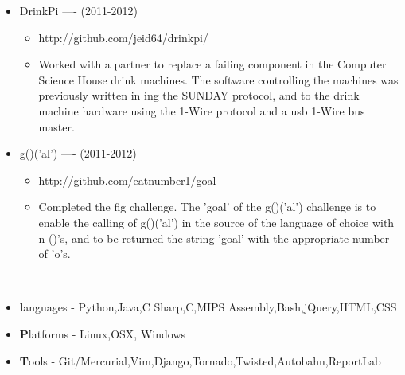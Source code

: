 \documentclass[a4paper,10pt]{article}
\newcommand{\isep}{-2 pt}
\newcommand{\lsep}{-0.5cm}
\begin{document}
\begin{itemize}
\item 
 DrinkPi ---- (2011-2012)    \\[-0.6cm]

	\begin{itemize}\itemsep \isep 
	\item http://github.com/jeid64/drinkpi/

	\item Worked with a partner to replace a failing component in the Computer Science House drink machines. The software controlling the machines was previously written in ing the SUNDAY protocol, and to the drink machine hardware using the 1-Wire protocol and a usb 1-Wire bus master. 

	\end{itemize}
\end{itemize}

\begin{itemize}
\item 
 g()('al') ---- (2011-2012)    \\[-0.6cm]

	\begin{itemize}\itemsep \isep 
	\item http://github.com/eatnumber1/goal

	\item Completed the fig challenge. The 'goal' of the g()('al') challenge is to enable the calling of g()('al') in the source of the language of choice with n ()'s, and to be returned the string 'goal' with the appropriate number of 'o's. 

	\end{itemize}
\end{itemize}




\\[\lsep]

\begin{itemize}
\item \noindent \textbf languages - Python,Java,C Sharp,C,MIPS Assembly,Bash,jQuery,HTML,CSS
\end{itemize}

\begin{itemize}
\item \noindent \textbf Platforms - Linux,OSX, Windows
\end{itemize}

\begin{itemize}
\item \noindent \textbf Tools - Git/Mercurial,Vim,Django,Tornado,Twisted,Autobahn,ReportLab
\end{itemize}
\end{document}

